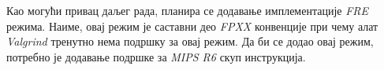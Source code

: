 \documentclass[12pt,oneside]{memoir}
\begin{document}
\indent Као могући привац даљег рада, планира се додавање имплементације \textit{FRE} режима. Наиме, овај режим је саставни део  \textit{FPXX} конвенције при чему алат \textit{Valgrind} тренутно нема подршку за овај режим. Да би се додао овај режим, потребно је додавање подршке за \textit{MIPS R6} скуп инструкција.



\literatura

\backmatter

\end{document}
